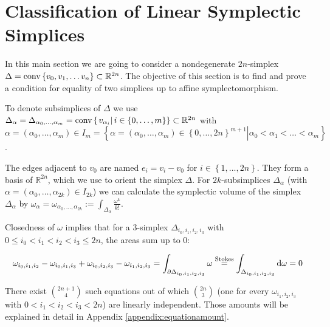 \documentclass[../SymplecticSimplices.tex]{subfiles}
\begin{document}
\section{Classification of Linear Symplectic Simplices}
\label{section:simplexclassification}

In this main section we are going to consider a nondegenerate \( 2n \)-simplex \( \Delta = \textnormal{conv} \left\lbrace v_0, v_1, \dots v_n \right\rbrace \subset \mathbb{R}^{2n} \). The objective of this section is to find and prove a condition for equality of two simplices up to affine symplectomorphism.

To denote subsimplices of \( \Delta \) we use \( \Delta_{\alpha} = \Delta_{\alpha_0, \dots, \alpha_m} = \textnormal{conv} \left\lbrace \left. v_{\alpha_i} \right| i \in \left\lbrace 0, \dots, m \right\rbrace \right\rbrace \subset \mathbb{R}^{2n} \) with \( \alpha = \left( \alpha_0, \dots, \alpha_m \right) \in I_m = \left\lbrace \left. \alpha = \left( \alpha_0, \dots, \alpha_{m} \right) \in \left\lbrace 0, \dots, 2n \right\rbrace^{m+1} \right| \alpha_0 < \alpha_1 < \dots < \alpha_m \right\rbrace \).

The edges adjacent to \(v_0 \) are named \( e_i = v_i - v_0 \) for \( i \in \left\lbrace 1, \dots, 2n \right\rbrace \). They form a basis of \( \mathbb{R}^{2n} \), which we use to orient the simplex \( \Delta \). For \( 2k \)-subsimplices \( \Delta_{\alpha} \) (with \( \alpha = \left( \alpha_0, \dots, \alpha_{2k} \right) \in I_{2k} \)) we can calculate the symplectic volume of the simplex \( \Delta_\alpha \) by \( \omega_{\alpha} = \omega_{\alpha_0, \dots, \alpha_{2k}} := \int_{\Delta_{\alpha}} \frac{\omega^k}{k!} \).

Closedness of \( \omega \) implies that for a 3-simplex \( \Delta_{i_0, i_1, i_2, i_3} \) with \( 0 \leq i_0 < i_1 < i_2 < i_3 \leq 2n \), the areas sum up to \( 0 \):

\begin{equation}
  \label{equation:3simplexzero}
  \omega_{i_0, i_1, i_2} - \omega_{i_0, i_1, i_3} + \omega_{i_0, i_2, i_3} - \omega_{i_1, i_2, i_3} = \int_{\partial \Delta_{i_0, i_1, i_2, i_3}} \omega \stackrel{\text{Stokes}}{=} \int_{\Delta_{i_0, i_1, i_2, i_3}} \textnormal{d}\omega = 0
\end{equation}

There exist \( \binom{2n+1}{4} \) such equations out of which \( \binom{2n}{3} \) (one for every \( \omega_{i_1, i_2, i_3} \) with \( 0 < i_1 < i_2 < i_3 < 2n \)) are linearly independent. Those amounts will be explained in detail in Appendix \ref{appendix:equationamount}.
\end{document}

